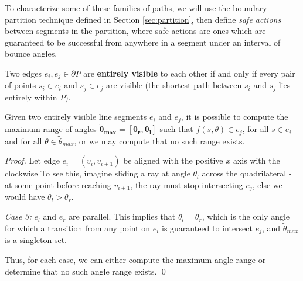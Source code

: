 \documentclass[]{styles/svproc}  %
\begin{document}
To characterize some of these families of paths, we will use the boundary
partition technique defined in Section \ref{sec:partition}, then define
\emph{safe actions} between segments in the partition, where safe actions are
ones which are guaranteed to be successful from anywhere in a segment under an
interval of bounce angles.

\begin{definition}
Two edges $e_i,e_j \in \partial P$ are \textbf{entirely visible} to each other if
and only if every pair of points $s_i \in e_i$ and $s_j \in e_j$ are visible (the
shortest path between $s_i$ and $s_j$ lies entirely within $P$).
\end{definition}

\begin{proposition} \label{prop:saferange}
Given two entirely visible line segments $e_i$ and $e_j$, it is possible to compute
the maximum range of angles $\bm{\tilde{\theta}_{max} = [\theta_r, \theta_l]}$ such
that $f(s, \theta) \in e_j$, for all $s \in e_i$ and for all
$\theta \in \tilde{\theta}_{max}$, or we may compute that no such range exists.
\end{proposition}

\begin{proof}

Let edge $e_i = (v_i, v_{i+1})$ be aligned with the positive $x$ axis with the clockwise
%
To see this, imagine sliding a ray at angle $\theta_l$ across the quadrilateral
- at some point before reaching $v_{i+1}$, the ray must stop intersecting $e_j$,
else we would have $\theta_l > \theta_r$.

\emph{Case 3:} $e_l$ and $e_r$ are parallel. This implies that $\theta_{l} =
\theta_{r}$, which is the only angle for which a transition from any
point on $e_i$ is guaranteed to intersect $e_j$, and $\tilde{\theta}_{max}$ is a
singleton set.

Thus, for each case, we can either compute the maximum angle range or determine
that no such angle range exists.
\qed

\end{proof}
\end{document}
